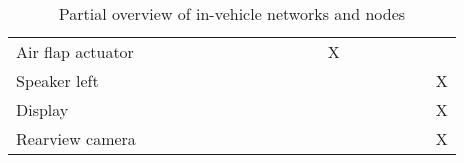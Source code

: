 \begin{table}[htb]
{\begin{tabular}{lllllllllllllllllll}
    Air flap actuator                            &   &   &   &   &   &   &   &   &   &   &   & \multicolumn{1}{c|}{X} &   &   &   &   &   &   \\
    \rowcolor[gray]{0.925}
    Speaker left                                 &   &   &   &   &   &   &   &   &   &   &   & \multicolumn{1}{c|}{}  &   &   &   &   &   & X \\
    Display                                      &   &   &   &   &   &   &   &   &   &   &   & \multicolumn{1}{c|}{}  &   &   &   &   &   & X \\
    \rowcolor[gray]{0.925}
    Rearview camera                              &   &   &   &   &   &   &   &   &   &   &   & \multicolumn{1}{c|}{}  &   &   &   &   &   & X \\
\end{tabular}%
}
\caption{Partial overview of in-vehicle networks and nodes}
\label{tab:networkoverview}
\end{table}
\endgroup